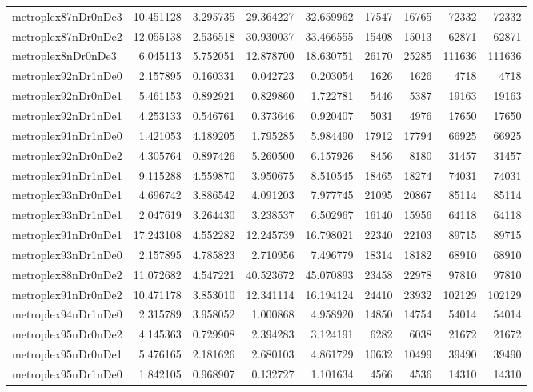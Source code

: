 \begin{longtable}{|l|r|r|r|r|r|r|r|r|}
metroplex87nDr0nDe3 & 10.451128 & 3.295735 & 29.364227 & 32.659962 & 17547 & 16765 & 72332 & 72332 \\
metroplex87nDr0nDe2 & 12.055138 & 2.536518 & 30.930037 & 33.466555 & 15408 & 15013 & 62871 & 62871 \\
metroplex8nDr0nDe3 & 6.045113 & 5.752051 & 12.878700 & 18.630751 & 26170 & 25285 & 111636 & 111636 \\
metroplex92nDr1nDe0 & 2.157895 & 0.160331 & 0.042723 & 0.203054 & 1626 & 1626 & 4718 & 4718 \\
metroplex92nDr0nDe1 & 5.461153 & 0.892921 & 0.829860 & 1.722781 & 5446 & 5387 & 19163 & 19163 \\
metroplex92nDr1nDe1 & 4.253133 & 0.546761 & 0.373646 & 0.920407 & 5031 & 4976 & 17650 & 17650 \\
metroplex91nDr1nDe0 & 1.421053 & 4.189205 & 1.795285 & 5.984490 & 17912 & 17794 & 66925 & 66925 \\
metroplex92nDr0nDe2 & 4.305764 & 0.897426 & 5.260500 & 6.157926 & 8456 & 8180 & 31457 & 31457 \\
metroplex91nDr1nDe1 & 9.115288 & 4.559870 & 3.950675 & 8.510545 & 18465 & 18274 & 74031 & 74031 \\
metroplex93nDr0nDe1 & 4.696742 & 3.886542 & 4.091203 & 7.977745 & 21095 & 20867 & 85114 & 85114 \\
metroplex93nDr1nDe1 & 2.047619 & 3.264430 & 3.238537 & 6.502967 & 16140 & 15956 & 64118 & 64118 \\
metroplex91nDr0nDe1 & 17.243108 & 4.552282 & 12.245739 & 16.798021 & 22340 & 22103 & 89715 & 89715 \\
metroplex93nDr1nDe0 & 2.157895 & 4.785823 & 2.710956 & 7.496779 & 18314 & 18182 & 68910 & 68910 \\
metroplex88nDr0nDe2 & 11.072682 & 4.547221 & 40.523672 & 45.070893 & 23458 & 22978 & 97810 & 97810 \\
metroplex91nDr0nDe2 & 10.471178 & 3.853010 & 12.341114 & 16.194124 & 24410 & 23932 & 102129 & 102129 \\
metroplex94nDr1nDe0 & 2.315789 & 3.958052 & 1.000868 & 4.958920 & 14850 & 14754 & 54014 & 54014 \\
metroplex95nDr0nDe2 & 4.145363 & 0.729908 & 2.394283 & 3.124191 & 6282 & 6038 & 21672 & 21672 \\
metroplex95nDr0nDe1 & 5.476165 & 2.181626 & 2.680103 & 4.861729 & 10632 & 10499 & 39490 & 39490 \\
metroplex95nDr1nDe0 & 1.842105 & 0.968907 & 0.132727 & 1.101634 & 4566 & 4536 & 14310 & 14310 \\

\end{longtable}
